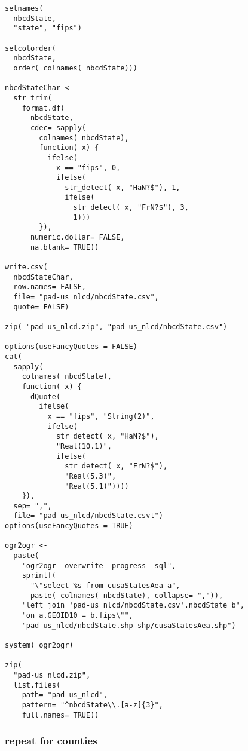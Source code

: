 \documentclass[11pt]{article}
\begin{document}
\begin{itemize}
\begin{verbatim}
setnames(
  nbcdState,
  "state", "fips")

setcolorder(
  nbcdState,
  order( colnames( nbcdState)))

nbcdStateChar <-
  str_trim(
    format.df(
      nbcdState,
      cdec= sapply(
        colnames( nbcdState),
        function( x) {
          ifelse(
            x == "fips", 0,
            ifelse(
              str_detect( x, "HaN?$"), 1,
              ifelse(
                str_detect( x, "FrN?$"), 3,
                1)))
        }),
      numeric.dollar= FALSE,
      na.blank= TRUE))

write.csv(
  nbcdStateChar,
  row.names= FALSE,
  file= "pad-us_nlcd/nbcdState.csv",
  quote= FALSE)

zip( "pad-us_nlcd.zip", "pad-us_nlcd/nbcdState.csv")

options(useFancyQuotes = FALSE)
cat(
  sapply(
    colnames( nbcdState),
    function( x) {
      dQuote(
        ifelse(
          x == "fips", "String(2)",
          ifelse(
            str_detect( x, "HaN?$"),
            "Real(10.1)",
            ifelse(
              str_detect( x, "FrN?$"),
              "Real(5.3)",
              "Real(5.1)"))))
    }),
  sep= ",",
  file= "pad-us_nlcd/nbcdState.csvt")
options(useFancyQuotes = TRUE)

ogr2ogr <-
  paste(
    "ogr2ogr -overwrite -progress -sql",
    sprintf(
      "\"select %s from cusaStatesAea a",
      paste( colnames( nbcdState), collapse= ",")),
    "left join 'pad-us_nlcd/nbcdState.csv'.nbcdState b",
    "on a.GEOID10 = b.fips\"",
    "pad-us_nlcd/nbcdState.shp shp/cusaStatesAea.shp")

system( ogr2ogr)

zip(
  "pad-us_nlcd.zip",
  list.files(
    path= "pad-us_nlcd",
    pattern= "^nbcdState\\.[a-z]{3}",
    full.names= TRUE))
\end{verbatim}




\end{itemize} %
\subsubsection{repeat for counties}
\label{sec-3-5-5}
\end{document}
